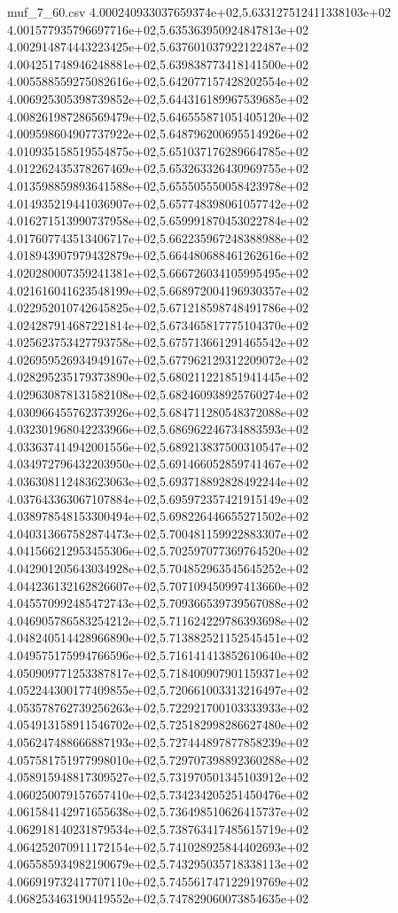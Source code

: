\begin{filecontents*}{muf_7_60.csv}
4.000240933037659374e+02,5.633127512411338103e+02
4.001577935796697716e+02,5.635363950924847813e+02
4.002914874443223425e+02,5.637601037922122487e+02
4.004251748946248881e+02,5.639838773418141500e+02
4.005588559275082616e+02,5.642077157428202554e+02
4.006925305398739852e+02,5.644316189967539685e+02
4.008261987286569479e+02,5.646555871051405120e+02
4.009598604907737922e+02,5.648796200695514926e+02
4.010935158519554875e+02,5.651037176289664785e+02
4.012262435378267469e+02,5.653263326430969755e+02
4.013598859893641588e+02,5.655505550058423978e+02
4.014935219441036907e+02,5.657748398061057742e+02
4.016271513990737958e+02,5.659991870453022784e+02
4.017607743513406717e+02,5.662235967248388988e+02
4.018943907979432879e+02,5.664480688461262616e+02
4.020280007359241381e+02,5.666726034105995495e+02
4.021616041623548199e+02,5.668972004196930357e+02
4.022952010742645825e+02,5.671218598748491786e+02
4.024287914687221814e+02,5.673465817775104370e+02
4.025623753427793758e+02,5.675713661291465542e+02
4.026959526934949167e+02,5.677962129312209072e+02
4.028295235179373890e+02,5.680211221851941445e+02
4.029630878131582108e+02,5.682460938925760274e+02
4.030966455762373926e+02,5.684711280548372088e+02
4.032301968042233966e+02,5.686962246734883593e+02
4.033637414942001556e+02,5.689213837500310547e+02
4.034972796432203950e+02,5.691466052859741467e+02
4.036308112483623063e+02,5.693718892828492244e+02
4.037643363067107884e+02,5.695972357421915149e+02
4.038978548153300494e+02,5.698226446655271502e+02
4.040313667582874473e+02,5.700481159922883307e+02
4.041566212953455306e+02,5.702597077369764520e+02
4.042901205643034928e+02,5.704852963545645252e+02
4.044236132162826607e+02,5.707109450997413660e+02
4.045570992485472743e+02,5.709366539739567088e+02
4.046905786583254212e+02,5.711624229786393698e+02
4.048240514428966890e+02,5.713882521152545451e+02
4.049575175994766596e+02,5.716141413852610640e+02
4.050909771253387817e+02,5.718400907901159371e+02
4.052244300177409855e+02,5.720661003313216497e+02
4.053578762739256263e+02,5.722921700103333933e+02
4.054913158911546702e+02,5.725182998286627480e+02
4.056247488666887193e+02,5.727444897877858239e+02
4.057581751977998010e+02,5.729707398892360288e+02
4.058915948817309527e+02,5.731970501345103912e+02
4.060250079157657410e+02,5.734234205251450476e+02
4.061584142971655638e+02,5.736498510626415737e+02
4.062918140231879534e+02,5.738763417485615719e+02
4.064252070911172154e+02,5.741028925844402693e+02
4.065585934982190679e+02,5.743295035718338113e+02
4.066919732417707110e+02,5.745561747122919769e+02
4.068253463190419552e+02,5.747829060073854635e+02

\end{filecontents*}
